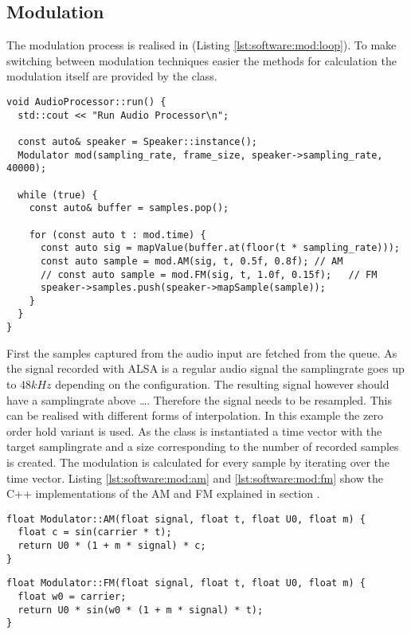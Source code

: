 \subsection{Modulation}
%
The modulation process is realised in  (Listing \ref{lst:software:mod:loop}). To make switching between modulation techniques easier the methods for calculation the modulation itself are provided by the  class.\p
%
\begin{mdframed}
\begin{lstlisting}[caption=Audio processing loop, label=lst:software:mod:loop]
void AudioProcessor::run() {
  std::cout << "Run Audio Processor\n";

  const auto& speaker = Speaker::instance();
  Modulator mod(sampling_rate, frame_size, speaker->sampling_rate, 40000);

  while (true) {
    const auto& buffer = samples.pop();

    for (const auto t : mod.time) {
      const auto sig = mapValue(buffer.at(floor(t * sampling_rate)));
      const auto sample = mod.AM(sig, t, 0.5f, 0.8f); // AM
      // const auto sample = mod.FM(sig, t, 1.0f, 0.15f);   // FM
      speaker->samples.push(speaker->mapSample(sample));
    }
  }
}
\end{lstlisting}
\end{mdframed}
%
First the samples captured from the audio input are fetched from the  queue. As the signal recorded with ALSA is a regular audio signal the samplingrate goes up to $48kHz$ depending on the configuration. The resulting signal however should have a samplingrate above \dots. Therefore the signal needs to be resampled. This can be realised with different forms of interpolation. In this example the zero order hold variant is used.\p
%
As the  class is instantiated a time vector with the target samplingrate and a size corresponding to the number of recorded samples is created. The modulation is calculated for every sample by iterating over the time vector.\p
%
Listing \ref{lst:software:mod:am} and \ref{lst:software:mod:fm} show the C++ implementations of the AM and FM explained in section .
%
\begin{mdframed}
\begin{lstlisting}[caption=Amplitude modulation, label=lst:software:mod:am]
float Modulator::AM(float signal, float t, float U0, float m) {
  float c = sin(carrier * t);
  return U0 * (1 + m * signal) * c;
}
\end{lstlisting}
\end{mdframed}
%
\begin{mdframed}
\begin{lstlisting}[caption=Frequency modulation, label=lst:software:mod:fm]
float Modulator::FM(float signal, float t, float U0, float m) {
  float w0 = carrier;
  return U0 * sin(w0 * (1 + m * signal) * t);
}
\end{lstlisting}
\end{mdframed}